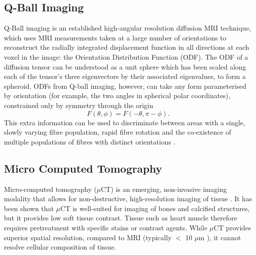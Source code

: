   \subsection{Q-Ball Imaging} %
  \label{sub:q_ball_imaging}
    Q-Ball imaging is an established high-angular resolution diffusion MRI technique, which uses MRI measurements taken at a large number of orientations to reconstruct the radially integrated displacement function in all directions at each voxel in the image: the Orientation Distribution Function (ODF). The ODF of a diffusion tensor can be understood as a unit sphere which has been scaled along each of the tensor's three eigenvectors by their associated eigenvalues, to form a spheroid. ODFs from Q-ball imaging, however, can take any form parameterised by orientation (for example, the two angles in spherical polar coordinates), constrained only by symmetry through the origin
    \begin{equation}
      F(\theta, \phi) = F(-\theta, \pi - \phi).
    \end{equation}
    This extra information can be used to discriminate between areas with a single, slowly varying fibre population, rapid fibre rotation and the co-existence of multiple populations of fibres with distinct orientations \cite{Dierckx2009}.
  
  
  \subsection{Micro Computed Tomography} %
  \label{sub:micro_computed_tomography}
    Micro-computed tomography ($\mu$CT) is an emerging, non-invasive imaging modality that allows for non-destructive, high-resolution imaging of tissue \cite{Ragan2007,Deng2012}. It has been shown that $\mu$CT is well-suited for imaging of bones and calcified structures, but it provides low soft tissue contrast. Tissue such as heart muscle therefore requires pretreatment with specific stains or contrast agents. While $\mu$CT provides superior spatial resolution, compared to MRI (typically $<$ 10 $\mu$m \cite{Metscher2009,Stephenson2012}), it cannot resolve cellular composition of tissue.
  
